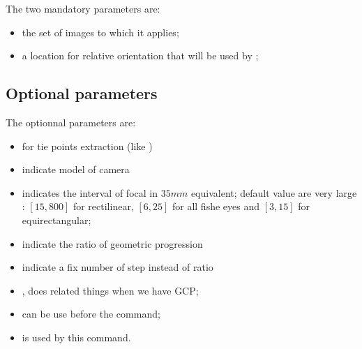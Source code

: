 \documentclass[a4paper]{article}
\begin{document}
The two mandatory parameters are:

\begin{itemize}
  \item the set of images to which it applies;
  \item a location for  relative orientation that will be used by ;
\end{itemize}


\subsection{Optional parameters}

The optionnal parameters are:

\begin{itemize}
   \item {} for tie points extraction (like )
   \item {}  indicate model of camera
   \item {}  indicates the interval of focal in $35mm$ equivalent; default value are very large :
          $[15,800]$ for rectilinear, $[6,25]$ for all fishe eyes and $[3,15]$ for equirectangular;
   \item {}  indicate the ratio of geometric progression
   \item {}  indicate a fix number of step instead of ratio
\end{itemize}


\SecRelatedCmd


\begin{itemize}
   \item  {}, does related things when we have GCP;
   \item  {} can be use before the command;
   \item  {} is used by this command.
\end{itemize}
\end{document}
